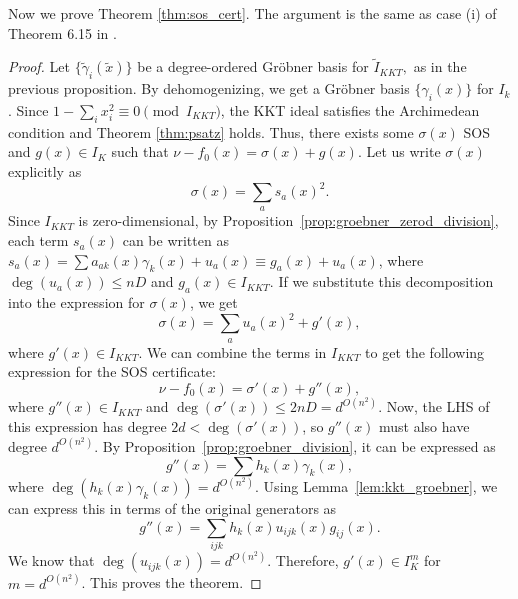 \documentclass[aps,pra,notitlepage,preprintnumbers,11pt,tightenlines]{revtex4-1}
\begin{document}
Now we prove Theorem \ref{thm:sos_cert}. The argument is the same as
case (i) of Theorem 6.15 in \cite{laurent:2009}.

\begin{proof}
  Let $\{\tilde{\gamma}_i(\tilde x)\}$ be a degree-ordered Gr\"{o}bner basis for
  $\tilde{I}_{KKT},$ as in the previous proposition. By
  dehomogenizing, we get a Gr\"{o}bner basis $\{\gamma_i(x)\}$ for
  $I_k$. Since $1 - \sum_i x_i^2 \equiv 0 \pmod{I_{KKT}}$, the KKT ideal satisfies the
  Archimedean condition and Theorem \ref{thm:psatz} holds.
  Thus, there exists some $\sigma(x)$ SOS and
  $g(x) \in I_K$ such that $\nu - f_0(x) = \sigma(x) + g(x)$. Let us
  write $\sigma(x)$ explicitly as
  \[ \sigma(x) = \sum_a s_a(x)^2. \]
  Since $I_{KKT}$ is zero-dimensional, by Proposition~\ref{prop:groebner_zerod_division}, each term $s_a(x)$
  can be written as $s_a(x) = \sum a_{ak}(x) \gamma_k(x) + u_a(x)
  \equiv g_a(x) + u_a(x)$, where $\deg(u_a(x)) \leq nD$ and $g_a(x) \in
  I_{KKT}$. If we substitute this decomposition into the expression
  for $\sigma(x)$, we get
  \[ \sigma(x) = \sum_a u_a(x)^2 + g'(x), \]
  where $g'(x) \in I_{KKT}$. We can combine the terms in $I_{KKT}$ to
  get the following expression for the SOS certificate:
  \[\nu - f_0(x) = \sigma'(x) + g''(x), \]
  where $g''(x) \in I_{KKT}$ and $\deg(\sigma'(x)) \leq 2nD = d^{O(n^2)}$. Now, the LHS of this
  expression has degree $2d < \deg(\sigma'(x))$, so $g''(x)$ must also have degree
  $d^{O(n^2)}$. By Proposition~\ref{prop:groebner_division}, it can
  be expressed as
  \[ g''(x) = \sum h_{k}(x) \gamma_{k}(x), \]
  where $\deg(h_{k}(x) \gamma_{k}(x)) = d^{O(n^2)}$. Using
  Lemma~\ref{lem:kkt_groebner}, we can 
  express this in terms of the original generators as
  \[ g''(x) = \sum_{ijk} h_{k}(x) u_{ijk}(x) g_{ij}(x). \]
  We know that $\deg(u_{ijk}(x)) = d^{O(n^2)}$. Therefore, $g'(x) \in
  I_K^m$ for $m = d^{O(n^2)}$. This proves the theorem.
\end{proof}
\end{document}

